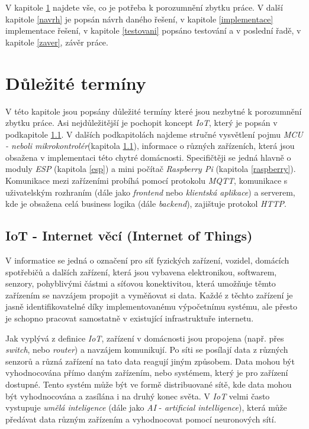V kapitole \ref{terminy} najdete vše, co je potřeba k porozumnění zbytku práce.
V další kapitole \ref{navrh} je popsán návrh daného řešení, v kapitole \ref{implementace} implementace řešení, v kapitole \ref{testovani} popsáno testování a v poslední řadě, v kapitole \ref{zaver}, závěr práce.

\chapter{Důležité termíny}
\label{terminy}

V této kapitole jsou popsány důležité termíny které jsou nezbytné k porozumnění zbytku práce.
Asi nejdůležitější je pochopit koncept \emph{IoT}, který je popsán v podkapitole \ref{terminy:iot}.
V dalších podkapitolách najdeme stručné vysvětlení pojmu \emph{MCU - neboli mikrokontrolér}(kapitola \ref{terminy:iot}), informace o různých zařízeních, která jsou obsažena v implementaci této chytré domácnosti.
Specifičtěji se jedná hlavně o moduly \emph{ESP} (kapitola \ref{esp}) a mini počítač \emph{Raspberry Pi} (kapitola \ref{raspberry}).
Komunikace mezi zařízeními probíhá pomocí protokolu \emph{MQTT}, komunikace s uživatelským rozhraním (dále jako \emph{frontend} nebo \emph{klientská aplikace}) a serverem, kde je obsažena celá business logika (dále \emph{backend}), zajištuje protokol \emph{HTTP}.

\bigskip

\section{IoT - Internet věcí (Internet of Things)}
\label{terminy:iot}

V informatice se jedná o označení pro síť fyzických zařízení, vozidel, domácích spotřebičů a dalších zařízení, která jsou vybavena elektronikou,
softwarem, senzory, pohyblivými částmi a síťovou konektivitou, která umožňuje těmto zařízením se navzájem propojit a vyměňovat si data.
Každé z těchto zařízení je jasně identifikovatelné díky implementovanému výpočetnímu systému,
ale přesto je schopno pracovat samostatně v existující infrastruktuře internetu.~\cite{wiki:iot}

Jak vyplývá z definice \emph{IoT}, zařízení v domácnosti jsou propojena (např. přes \emph{switch}, nebo \emph{router}) a navzájem komunikují.
Po síti se posílají data z různých senzorů a různá zařízení na tato data reagují jiným způsobem.
Data mohou být vyhodnocována přímo daným zařízením, nebo systémem, který je pro zařízení dostupné.
Tento systém může být ve formě distribuované sítě, kde data mohou být vyhodnocována a zasílána i na druhý konec světa.
V \emph{IoT} velmi často vystupuje \emph{umělá inteligence} (dále jako \emph{AI} - \emph{artificial intelligence}), která může předávat data různým zařízením a vyhodnocovat pomocí neuronových sítí.

